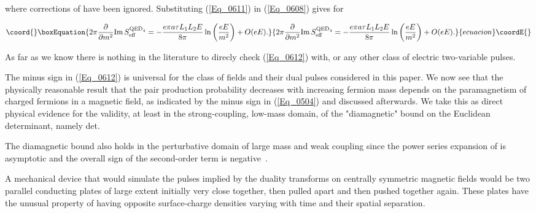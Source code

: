 \documentclass[a4paper,twocolumn,showpacs,preprintnumbers,amsmath,amssymb]{revtex4}
\providecommand{\pdo}[1]{\ensuremath{\frac{\partial }
        {\partial #1 }}}
\begin{document}
\noindent
where corrections of \coordHE{} have been ignored. Substituting
(\ref{Eq_0611}) in (\ref{Eq_0608}) gives for \coordHE{}

\begin{widetext}
\begin{equation}\coord{}\boxEquation{
\label{Eq_0612}
2\pi \pdo{m^2} \text{Im} \, S^{\text{QED}_4}_{\text{eff}}
  = -\frac{e\pi a \tau L_1 L_2 E}{8\pi} \ln\left(\frac{eE}{m^2}\right)
    + O(eE).
}{
2\pi \pdo{m^2} \text{Im} \, S^{\text{QED}_4}_{\text{eff}}
  = -\frac{e\pi a \tau L_1 L_2 E}{8\pi} \ln\left(\frac{eE}{m^2}\right)
    + O(eE).
}{ecuacion}\coordE{}\end{equation}
\end{widetext}

\noindent
As far as we know there is nothing in the literature to direcly check
(\ref{Eq_0612}) with, or any other class of electric two-variable
pulses.

The minus sign in (\ref{Eq_0612}) is universal for the class of fields
and their dual pulses considered in this paper. We now see that the
physically reasonable result that the pair production probability
\coordHE{} decreases with increasing
fermion mass depends on the paramagnetism of charged fermions in a
magnetic field, as indicated by the minus sign in (\ref{Eq_0504}) and
discussed afterwards. We take this as direct physical evidence for the
validity, at least in the strong-coupling, low-mass domain, of the
"diamagnetic" bound on the Euclidean determinant, namely
det\coordHE{}.

The diamagnetic bound also holds in the perturbative domain of large
mass and weak coupling since the power series expansion of
\coordHE{} is asymptotic and the overall sign of the
second-order term is negative~\cite{Fry00a}.

A mechanical device that would simulate the pulses implied by the
duality transforms on centrally symmetric magnetic fields would be
two parallel conducting plates of large extent initially very close
together, then pulled apart and then pushed together again. These
plates have the unusual property of having opposite surface-charge
densities varying with time and their spatial separation.
\end{document}
